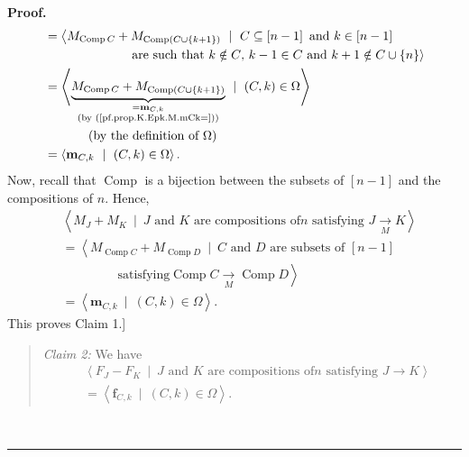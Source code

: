 \documentclass[numbers=enddot,12pt,final,onecolumn,notitlepage]{scrartcl}%
\theoremstyle{definition}
\newenvironment{statement}{\begin{quote}}{\end{quote}}
\newenvironment{proof}[1][Proof]{\noindent\textbf{#1.} }{\ \rule{0.5em}{0.5em}}
\newenvironment{verlong}{}{}
\begin{document}
\begin{verlong}
\begin{proof}
\begin{align*}
&  =\left\langle M_{\operatorname*{Comp}C}+M_{\operatorname*{Comp}\left(
C\cup\left\{  k+1\right\}  \right)  }\ \mid\ C\subseteq\left[  n-1\right]
\text{ and }k\in\left[  n-1\right]  \right. \\
&  \ \ \ \ \ \ \ \ \ \ \ \ \ \ \ \ \ \ \ \ \left.  \text{are such that
}k\notin C\text{, }k-1\in C\text{ and }k+1\notin C\cup\left\{  n\right\}
\right\rangle \\
&  =\left\langle \underbrace{M_{\operatorname*{Comp}C}+M_{\operatorname*{Comp}%
\left(  C\cup\left\{  k+1\right\}  \right)  }}_{\substack{=\mathbf{m}%
_{C,k}\\\text{(by (\ref{pf.prop.K.Epk.M.mCk=}))}}}\ \mid\ \left(  C,k\right)
\in\Omega\right\rangle \\
&  \ \ \ \ \ \ \ \ \ \ \left(  \text{by the definition of }\Omega\right) \\
&  =\left\langle \mathbf{m}_{C,k}\ \mid\ \left(  C,k\right)  \in
\Omega\right\rangle .
\end{align*}
Now, recall that $\operatorname*{Comp}$ is a bijection between the subsets of
$\left[  n-1\right]  $ and the compositions of $n$. Hence,%
\begin{align*}
&  \left\langle M_{J}+M_{K}\ \mid\ J\text{ and }K\text{ are compositions of
}n\text{ satisfying }J\underset{M}{\rightarrow}K\right\rangle \\
&  =\left\langle M_{\operatorname*{Comp}C}+M_{\operatorname*{Comp}D}%
\ \mid\ C\text{ and }D\text{ are subsets of }\left[  n-1\right]  \right. \\
&  \ \ \ \ \ \ \ \ \ \ \ \ \ \ \ \ \ \ \ \ \left.  \text{satisfying
}\operatorname*{Comp}C\underset{M}{\rightarrow}\operatorname*{Comp}%
D\right\rangle \\
&  =\left\langle \mathbf{m}_{C,k}\ \mid\ \left(  C,k\right)  \in
\Omega\right\rangle .
\end{align*}
This proves Claim 1.]

\begin{statement}
\textit{Claim 2:} We have%
\begin{align*}
&  \left\langle F_{J}-F_{K}\ \mid\ J\text{ and }K\text{ are compositions of
}n\text{ satisfying }J\rightarrow K\right\rangle \\
&  =\left\langle \mathbf{f}_{C,k}\ \mid\ \left(  C,k\right)  \in
\Omega\right\rangle .
\end{align*}

\end{statement}


\end{proof}
\end{verlong}
\end{document}
